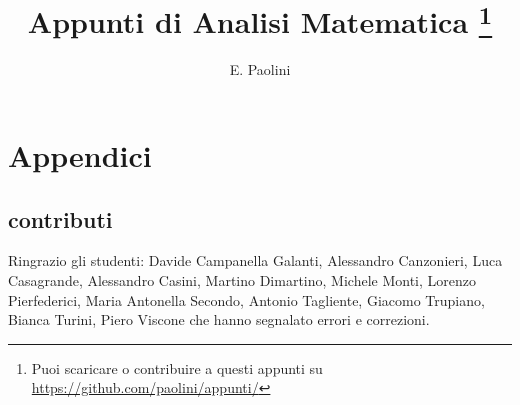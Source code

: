 \documentclass[italian,a4paper,oneside,headinclude]{scrbook}
\title{Appunti di Analisi Matematica%
\thanks{%
Puoi scaricare o contribuire a questi appunti su
\url{https://github.com/paolini/appunti/}}}
\author{E. Paolini}
\begin{document}
\maketitle

\tableofcontents













\backmatter
\chapter{Appendici}

\section{contributi}

Ringrazio gli studenti:
%
Davide Campanella Galanti,
Alessandro Canzonieri,
Luca Casagrande,
Alessandro Casini,
Martino Dimartino,
Michele Monti,
Lorenzo Pierfederici,
Maria Antonella Secondo,
Antonio Tagliente,
Giacomo Trupiano,
Bianca Turini,
Piero Viscone
%
che hanno segnalato errori e correzioni.

\nocite{Giusti}
\nocite{Courant}
\nocite{Marcellini}




\printindex
\end{document}
